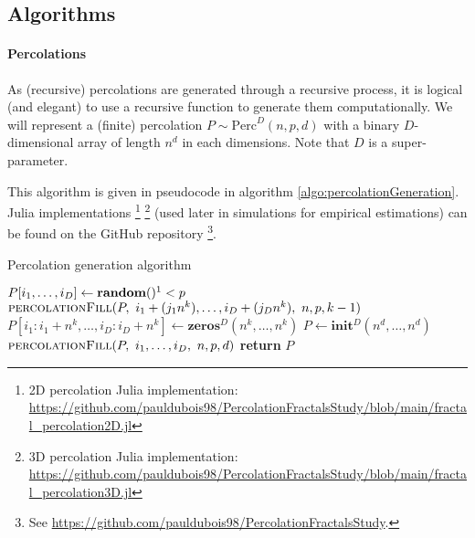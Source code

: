 \subsection{Algorithms}
\paragraph{Percolations}
As (recursive) percolations are generated through a recursive process, it is logical (and elegant) to use a recursive function to generate them computationally.
We will represent a (finite) percolation $P \sim \text{Perc}^D(n,p,d)$ with a binary $D$-dimensional array of length $n^d$ in each dimensions.
Note that $D$ is a super-parameter.

This algorithm is given in pseudocode in algorithm \ref{algo:percolationGeneration}. Julia implementations
\footnote{2D percolation Julia implementation: \url{https://github.com/pauldubois98/PercolationFractalsStudy/blob/main/fractal\_percolation2D.jl}}
\footnote{3D percolation Julia implementation: \url{https://github.com/pauldubois98/PercolationFractalsStudy/blob/main/fractal\_percolation3D.jl}}
(used later in simulations for empirical estimations) can be found on the GitHub repository
\footnote{See \url{https://github.com/pauldubois98/PercolationFractalsStudy}.}.

\begin{algorithm}[!h]
	\caption{Percolation generation algorithm}\label{algo:percolationGeneration}
	\begin{algorithmic}[1]
		\State $P[i_1,\dots,i_D] \gets \textbf{random}()\footnotemark < p$ 
		\Else
		\State $\textsc{percolationFill}(P, \ i_1+(j_1 n^k),\dots,i_D+(j_D n^k), \ n, p, k-1)$ 
		\Else
		\State $P[i_1:i_1+n^k,\dots,i_D:i_D+n^k] \gets \textbf{zeros$^D$}(n^k,\dots,n^k)$ 
		\EndIf
		\EndFor
		\EndIf
		\EndProcedure
		\State $P \gets \textbf{init$^D$}(n^d,\dots,n^d)$
		\State $\textsc{percolationFill}(P, \ i_1,\dots,i_D, \ n, p, d)$ 
		\State \textbf{return} $P$
		\EndProcedure
	\end{algorithmic}
\end{algorithm}
\addtocounter{footnote}{-1}
\addtocounter{footnote}{-1}

